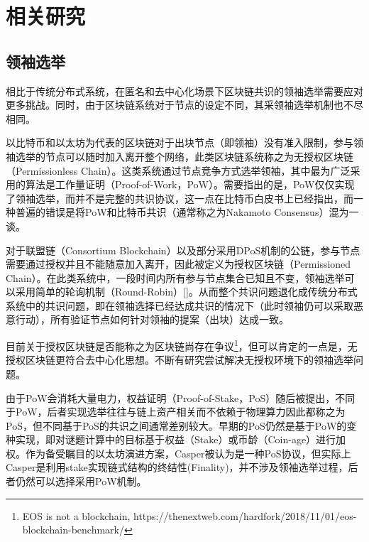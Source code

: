 \section{相关研究}
\subsection{领袖选举}
相比于传统分布式系统，在匿名和去中心化场景下区块链共识的领袖选举需要应对更多挑战。同时，由于区块链系统对于节点的设定不同，其采领袖选举机制也不尽相同。

以比特币\cite{nakamoto2008bitcoin}和以太坊\cite{wood2014ethereum}为代表的区块链对于出块节点（即领袖）没有准入限制，参与领袖选举的节点可以随时加入离开整个网络，此类区块链系统称之为无授权区块链（Permissionless Chain）。这类系统通过节点竞争方式选举领袖，其中最为广泛采用的算法是工作量证明（Proof-of-Work，PoW）。需要指出的是，PoW仅仅实现了领袖选举，而并不是完整的共识协议，这一点在比特币白皮书上已经指出\cite{nakamoto2008bitcoin}，而一种普遍的错误是将PoW和比特币共识（通常称之为Nakamoto Consensus）混为一谈。

对于联盟链（Consortium Blockchain）以及部分采用DPoS机制的公链\cite{grigg2017eos}，参与节点需要通过授权并且不能随意加入离开，因此被定义为授权区块链（Permissioned Chain）。在此类系统中，一段时间内所有参与节点集合已知且不变，领袖选举可以采用简单的轮询机制（Round-Robin）[]。从而整个共识问题退化成传统分布式系统中的共识问题，即在领袖选择已经达成共识的情况下（此时领袖仍可以采取恶意行动），所有验证节点如何针对领袖的提案（出块）达成一致。

目前关于授权区块链是否能称之为区块链尚存在争议\footnote{EOS is not a blockchain, https://thenextweb.com/hardfork/2018/11/01/eos-blockchain-benchmark/}，但可以肯定的一点是，无授权区块链更符合去中心化思想。不断有研究尝试解决无授权环境下的领袖选举问题。

由于PoW会消耗大量电力，权益证明（Proof-of-Stake，PoS）随后被提出，不同于PoW，后者实现选举往往与链上资产相关而不依赖于物理算力因此都称之为PoS，但不同基于PoS的共识之间通常差别较大。早期的PoS仍然是基于PoW的变种实现\cite{king2012ppcoin}，即对谜题计算中的目标基于权益（Stake）或币龄（Coin-age）进行加权。作为备受瞩目的以太坊演进方案，Casper\cite{buterin2017casper}被认为是一种PoS协议，但实际上Casper是利用stake实现链式结构的终结性(Finality)，并不涉及领袖选举过程，后者仍然可以选择采用PoW机制。

